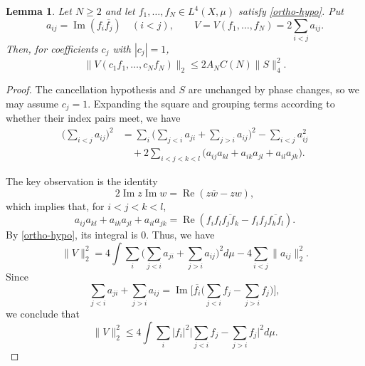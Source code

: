 \documentclass{amsart}
\numberwithin{equation}{section}
\newtheorem{lemma}[theorem]{Lemma}
\begin{document}
\begin{samepage}
\begin{lemma}
Let $N\geq2$ and let $f_1,\ldots,f_N\in L^4(X,\mu)$ satisfy
\eqref{ortho-hypo}. Put
\begin{equation*}
    a_{ij}=\operatorname{Im}(f_i\overline{f_j})\quad(i<j),
    \qquad
    V=V(f_1,\ldots, f_N)=2\sum_{i<j}a_{ij}.
\end{equation*}
Then, for coefficients $c_j$ with $|c_j|=1$, 
\begin{equation}
    \|V(c_1f_1,\ldots,c_N f_N)\|_2\leq 2A_N C(N)\|S\|_4^2.
\end{equation}

\end{lemma}
\end{samepage}
\begin{proof}

The cancellation hypothesis and $S$ are unchanged by phase changes, so we may assume $c_j=1$.
Expanding the square and grouping terms according to whether their index pairs meet, we have
\begin{equation}
\nonumber
\begin{aligned}
    \Big(\sum_{i<j}a_{ij}\Big)^2
    &=\sum_i\Big(\sum_{j<i}a_{ji}+\sum_{j>i}a_{ij}\Big)^2
    -\sum_{i<j}a_{ij}^2\\
    &\quad+2\sum_{i<j<k<l}
    \bigl(a_{ij}a_{kl}+a_{ik}a_{jl}+a_{il}a_{jk}\bigr).
\end{aligned}
\end{equation} 

The key observation is the identity 
\[
    2\operatorname{Im}z\operatorname{Im}w=\operatorname{Re}(z\overline{w}-zw),
\]
which implies that, for $i<j<k<l$,
\begin{equation*}
    a_{ij}a_{kl}+a_{ik}a_{jl}+a_{il}a_{jk}
    =\operatorname{Re}\left(
    f_i f_l\overline{f_j f_k}-f_i f_j\overline{f_k f_l}
    \right).
\end{equation*}
By \eqref{ortho-hypo}, its integral is $0$.
Thus, we have
\begin{equation*}
    \|V\|_2^2
    =4\int\sum_i
    \Big(\sum_{j<i}a_{ji}+\sum_{j>i}a_{ij}\Big)^2d\mu
    -4\sum_{i<j}\|a_{ij}\|_2^2.
\end{equation*}
Since
\begin{equation*}
    \sum_{j<i}a_{ji}+\sum_{j>i}a_{ij}
    =\operatorname{Im}\Big[
    \overline{f_i}\Big(\sum_{j<i}f_j-\sum_{j>i}f_j\Big)
    \Big],
\end{equation*}
we conclude that
\begin{equation}
\label{eq:oqo-row-energy}
    \|V\|_2^2
    \le 4\int\sum_i|f_i|^2
    \Big|\sum_{j<i}f_j-\sum_{j>i}f_j\Big|^2d\mu.
\end{equation}


\end{proof}
\end{document}
